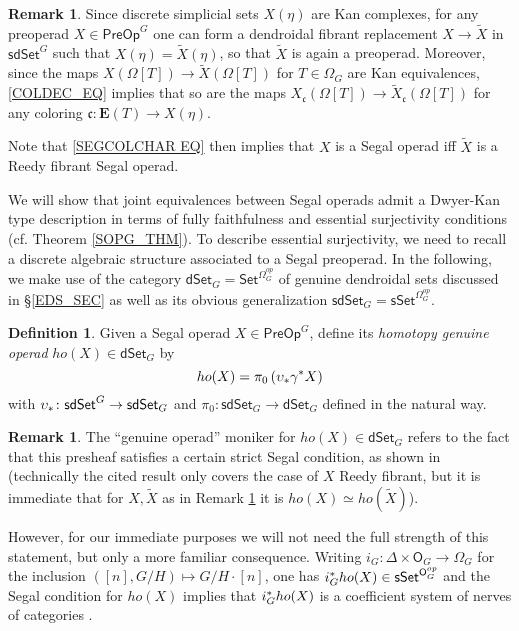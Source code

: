 \documentclass[a4paper,10pt]{article}%
\numberwithin{equation}{section}
\numberwithin{figure}{section}
\theoremstyle{definition} %
\newtheorem{definition}[equation]{Definition}%
\newtheorem{remark}[equation]{Remark}%
\newcommand{\dSet}{\mathsf{dSet}}
\newcommand{\1}{\ensuremath{\mathbbm 1}}%
\begin{document}
\begin{remark}\label{REPSEGOPS REM}
Since discrete simplicial sets 
$X(\eta)$ are Kan complexes,
for any preoperad 
$X \in \mathsf{PreOp}^G$
one can form a dendroidal 
fibrant replacement 
$X \to \widetilde{X}$ in 
$\mathsf{sdSet}^G$
such that 
$X(\eta) = \widetilde{X}(\eta)$,
so that $\widetilde{X}$
is again a preoperad.
Moreover, since the maps
$X(\Omega[T]) \to \widetilde{X}(\Omega[T])$ for $T \in \Omega_G$
are Kan equivalences,
\eqref{COLDEC_EQ} %
implies that so are the maps
$X_{\mathfrak{c}}(\Omega[T]) \to \widetilde{X}_{\mathfrak{c}}(\Omega[T])$
for any coloring
$\mathfrak{c} \colon \boldsymbol{E}(T) \to X(\eta)$.

Note that \eqref{SEGCOLCHAR EQ} 
then implies that $X$ is a Segal operad iff 
$\widetilde{X}$ is a Reedy fibrant Segal operad.
\end{remark}



We will show that joint equivalences 
between Segal operads
admit a Dwyer-Kan type description 
in terms of fully faithfulness and essential surjectivity 
conditions (cf. Theorem \ref{SOPG_THM}).
To describe essential surjectivity,
we need to recall a discrete 
algebraic structure associated to a Segal preoperad.
In the following, we make use of the category
$\mathsf{dSet}_G= \mathsf{Set}^{\Omega_G^{op}}$
of genuine dendroidal sets 
discussed in \S \ref{EDS_SEC}
as well as its obvious generalization
$\mathsf{sdSet}_G= \mathsf{sSet}^{\Omega_G^{op}}$.



\begin{definition}
	Given a Segal operad $X \in \mathsf{PreOp}^G$,
	define its \emph{homotopy genuine operad} $ho(X) \in \dSet_G$ by
\[
	ho(X) = \pi_0\left(\upsilon_{\**}\gamma^{\**}X\right)
\]
	with 
	$\upsilon_{\**} \colon \mathsf{sdSet}^G \to \mathsf{sdSet}_G$
	and 
	$\pi_0 \colon \mathsf{sdSet}_G \to \mathsf{dSet}_G$
	defined in the natural way. 
\end{definition}


\begin{remark}
	The ``genuine operad'' moniker for 
	$ho(X)\in \dSet_G$ refers to the fact that this presheaf satisfies a certain strict Segal condition, as shown in \cite[Prop. 5.9]{BP_edss}
	(technically the cited result only covers the case of $X$ Reedy fibrant, but it is immediate that for 
	$X,\widetilde{X}$ as in
	Remark \ref{REPSEGOPS REM} it is $ho(X) \simeq ho(\widetilde{X})$).
	
	However, for our immediate purposes we will not need the full strength of this statement, 
	but only a more familiar consequence.
	Writing
	$i_G \colon \Delta \times \mathsf{O}_G \to \Omega_G$
	for the inclusion
	$([n],G/H) \mapsto G/H \cdot [n]$,
	one has 
	$i_G^{\**}ho(X)
	\in \mathsf{sSet}^{\mathsf{O}_G^{op}}$
	and the Segal condition for $ho(X)$ implies that 
	$i_G^{\**}ho(X)$
	is a coefficient system of 
	nerves of categories \cite[Rem. 5.11]{BP_edss}.
\end{remark}
\end{document}
